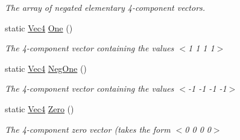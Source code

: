 \begin{DoxyCompactItemize}
\begin{DoxyCompactList}\small\item\em The array of negated elementary 4-\/component vectors. \end{DoxyCompactList}\item 
\hypertarget{classgfxmath_1_1_vec4_a533973443903b6fdc0e194e1f6c9b5ae}{}static \hyperlink{classgfxmath_1_1_vec4}{Vec4} \hyperlink{classgfxmath_1_1_vec4_a533973443903b6fdc0e194e1f6c9b5ae}{One} ()\label{classgfxmath_1_1_vec4_a533973443903b6fdc0e194e1f6c9b5ae}

\begin{DoxyCompactList}\small\item\em The 4-\/component vector containing the values $<$1 1 1 1$>$ \end{DoxyCompactList}\item 
\hypertarget{classgfxmath_1_1_vec4_a5c21fa07daf7054e189820c05bc2e0ee}{}static \hyperlink{classgfxmath_1_1_vec4}{Vec4} \hyperlink{classgfxmath_1_1_vec4_a5c21fa07daf7054e189820c05bc2e0ee}{Neg\+One} ()\label{classgfxmath_1_1_vec4_a5c21fa07daf7054e189820c05bc2e0ee}

\begin{DoxyCompactList}\small\item\em The 4-\/component vector containing the values $<$-\/1 -\/1 -\/1 -\/1$>$ \end{DoxyCompactList}\item 
\hypertarget{classgfxmath_1_1_vec4_aaacd0ad4911f4a53f82cc6979082b5c8}{}static \hyperlink{classgfxmath_1_1_vec4}{Vec4} \hyperlink{classgfxmath_1_1_vec4_aaacd0ad4911f4a53f82cc6979082b5c8}{Zero} ()\label{classgfxmath_1_1_vec4_aaacd0ad4911f4a53f82cc6979082b5c8}

\begin{DoxyCompactList}\small\item\em The 4-\/component zero vector (takes the form $<$0 0 0 0$>$ \end{DoxyCompactList}\end{DoxyCompactItemize}
